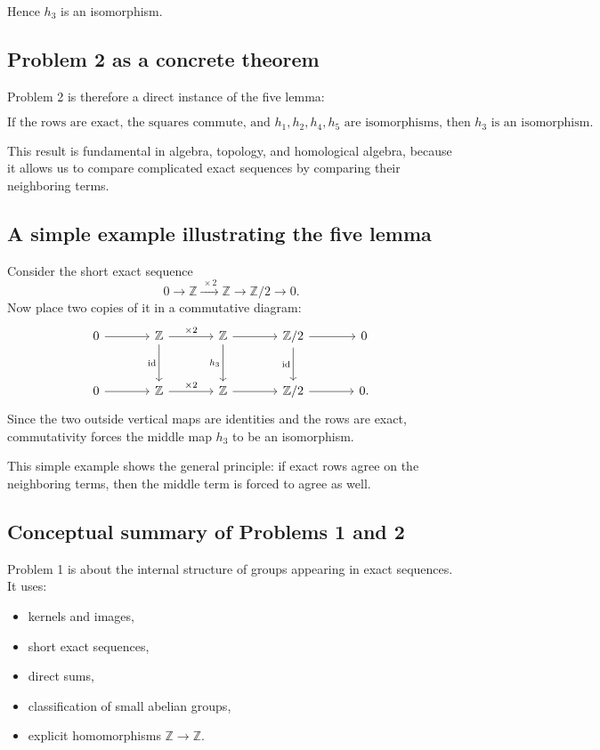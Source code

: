 \documentclass[12pt,a4paper]{article}
\theoremstyle{notespace}
\begin{document}
Hence \(h_3\) is an isomorphism.

\subsection{Problem 2 as a concrete theorem}

Problem 2 is therefore a direct instance of the five lemma:

\[
\boxed{
	\text{If the rows are exact, the squares commute, and } h_1,h_2,h_4,h_5
	\text{ are isomorphisms, then } h_3 \text{ is an isomorphism.}
}
\]

This result is fundamental in algebra, topology, and homological algebra, because it allows us to compare complicated exact sequences by comparing their neighboring terms.

\subsection{A simple example illustrating the five lemma}

Consider the short exact sequence
\[
0\longrightarrow \mathbb Z
\xrightarrow{\ \times 2\ }
\mathbb Z
\longrightarrow \mathbb Z/2
\longrightarrow 0.
\]
Now place two copies of it in a commutative diagram:
\[
\begin{tikzcd}[column sep=large, row sep=large]
	0 \arrow[r] &
	\mathbb Z \arrow[r,"\times 2"] \arrow[d,"\operatorname{id}"'] &
	\mathbb Z \arrow[r] \arrow[d,"h_3"'] &
	\mathbb Z/2 \arrow[r] \arrow[d,"\operatorname{id}"'] &
	0 \\
	0 \arrow[r] &
	\mathbb Z \arrow[r,"\times 2"] &
	\mathbb Z \arrow[r] &
	\mathbb Z/2 \arrow[r] &
	0.
\end{tikzcd}
\]
Since the two outside vertical maps are identities and the rows are exact, commutativity forces the middle map \(h_3\) to be an isomorphism.

This simple example shows the general principle: if exact rows agree on the neighboring terms, then the middle term is forced to agree as well.

\subsection{Conceptual summary of Problems 1 and 2}

Problem 1 is about the internal structure of groups appearing in exact sequences. It uses:

\begin{itemize}
	\item kernels and images,
	\item short exact sequences,
	\item direct sums,
	\item classification of small abelian groups,
	\item explicit homomorphisms \(\mathbb Z\to \mathbb Z\).
\end{itemize}
\end{document}
